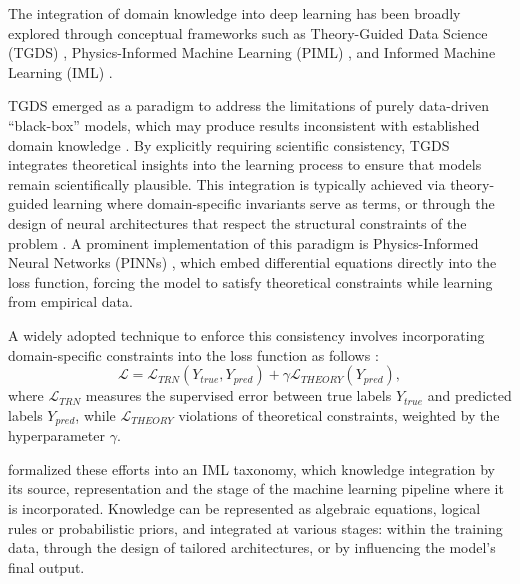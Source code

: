 \documentclass[applsci,article,submit,moreauthors,pdftex]{Definitions/mdpi}
\begin{document}
The integration of domain knowledge into deep learning has been broadly explored through conceptual frameworks such as Theory-Guided Data Science (TGDS) \citep{karpatne2017theory}, Physics-Informed Machine Learning (PIML) \citep{karniadakis2021physics}, and Informed Machine Learning (IML) \citep{vonrueden2021informed}. 


TGDS emerged as a paradigm to address the limitations of purely data-driven ``black-box'' models, which may produce results inconsistent with established domain knowledge \citep{karpatne2017theory}. By explicitly requiring scientific consistency, TGDS integrates theoretical insights into the learning process to ensure that models remain scientifically plausible. This integration is typically achieved via theory-guided learning where domain-specific invariants serve as  terms, or through the design of neural architectures that respect the structural constraints of the problem \citep{karpatne2017theory, jia2021physics}. A prominent implementation of this paradigm is Physics-Informed Neural Networks (PINNs) \citep{raissi2019physics, karniadakis2021physics}, which embed differential equations directly into the loss function, forcing the model to satisfy theoretical constraints while learning from empirical data. 

A widely adopted technique to enforce this consistency involves incorporating domain-specific constraints into the loss function as follows \citep{karpatne2017theory, willard2022integrating}: 
\begin{equation} \label{eq_theory_loss}
\mathcal{L} = \mathcal{L}_{TRN}(Y_{true}, Y_{pred}) + \gamma \mathcal{L}_{THEORY}(Y_{pred}),
\end{equation}
where $\mathcal{L}_{TRN}$ measures the supervised error between true labels $Y_{true}$ and predicted labels $Y_{pred}$, while $\mathcal{L}_{THEORY}$  violations of theoretical constraints, weighted by the hyperparameter $\gamma$. 

\citet{vonrueden2021informed} formalized these efforts into an IML taxonomy, which  knowledge integration by its source, representation and the stage of the machine learning pipeline where it is incorporated. Knowledge can be represented as algebraic equations, logical rules or probabilistic priors, and integrated at various stages: within the training data, through the design of tailored architectures, or by influencing the model's final output. 
\end{document}
